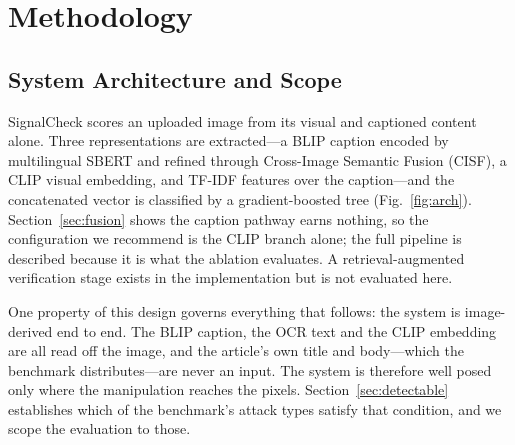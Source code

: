 \documentclass[journal]{IEEEtran}
\newcommand{\sysname}{SignalCheck}
\begin{document}
%
%
%

\section{Methodology}

\subsection{System Architecture and Scope}
\label{sec:scope}

\sysname{} scores an uploaded image from its visual and captioned content
alone. Three representations are extracted---a BLIP caption encoded by
multilingual SBERT and refined through Cross-Image Semantic Fusion (CISF), a
CLIP visual embedding, and TF-IDF features over the caption---and the
concatenated vector is classified by a gradient-boosted tree
(Fig.~\ref{fig:arch}). Section~\ref{sec:fusion} shows the caption pathway earns
nothing, so the configuration we recommend is the CLIP branch alone; the full
pipeline is described because it is what the ablation evaluates. A
retrieval-augmented verification stage exists in the implementation but is not
evaluated here.

One property of this design governs everything that follows: the system is
image-derived end to end. The BLIP caption, the OCR text and the CLIP embedding
are all read off the image, and the article's own title and body---which the
benchmark distributes---are never an input. The system is therefore well posed
only where the manipulation reaches the pixels. Section~\ref{sec:detectable}
establishes which of the benchmark's attack types satisfy that condition, and
we scope the evaluation to those.
\end{document}

